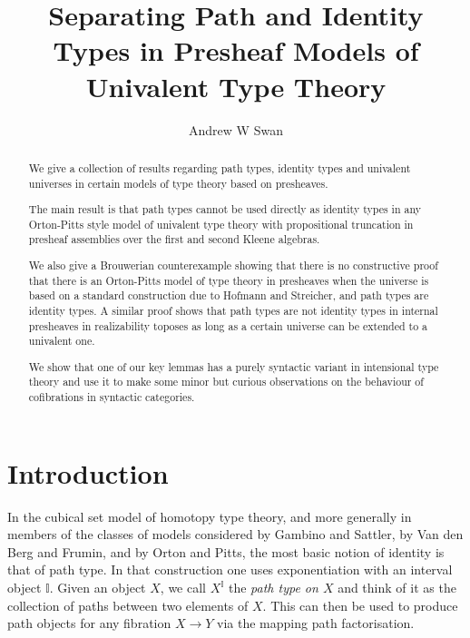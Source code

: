 \documentclass[a4paper]{amsart}
\title[Separating Path and Identity Types in Presheaves]
  {Separating Path and Identity Types in
  Presheaf Models of Univalent Type Theory}
\author{Andrew W Swan}
\theoremstyle{definition}
\newcommand{\intv}{\mathbb{I}}
\begin{document}
\maketitle

\begin{abstract}
  We give a collection of results regarding path types, identity types
  and univalent universes in certain models of type theory based on
  presheaves.
  
  The main result is that path types cannot be used directly as
  identity types in any Orton-Pitts style model of univalent type
  theory with propositional truncation in presheaf assemblies over the
  first and second Kleene algebras.

  We also give a Brouwerian counterexample showing that there is no
  constructive proof that there is an Orton-Pitts model of type theory
  in presheaves when the universe is based on a standard construction
  due to Hofmann and Streicher, and path types are identity types. A
  similar proof shows that path types are not identity types in
  internal presheaves in realizability toposes as long as a certain
  universe can be extended to a univalent one.

  We show that one of our key lemmas has a purely syntactic variant in
  intensional type theory and use it to make some minor but curious
  observations on the behaviour of cofibrations in syntactic
  categories.
\end{abstract}

\section{Introduction}
\label{sec:intro}

In the cubical set model of homotopy type theory, and more generally
in members of the classes of models considered by Gambino and Sattler,
by Van den Berg and Frumin, and by Orton and Pitts, the most basic
notion of identity is that of path type. In that construction one uses
exponentiation with an interval object $\intv$. Given an object $X$,
we call $X^\intv$ the \emph{path type on $X$} and think of it as the
collection of paths between two elements of $X$. This can then be used
to produce path objects for any fibration $X \to Y$ via the mapping
path factorisation.
\end{document}
